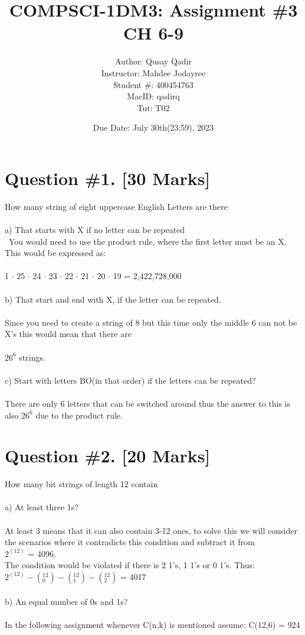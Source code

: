 \documentclass{article}
\title{
\LARGE COMPSCI-1DM3: Assignment \#3 CH 6-9 \\
}
\author{\Large Author: Qusay Qadir \\
\large Instructor: Mahdee Jodayree \\ Student \#: 400454763 \\MacID: qadirq  \\Tut: T02 \\ }
\date{Due Date: July 30th(23:59), 2023}
\begin{document}
\maketitle
\newpage
\tableofcontents
\newpage

\section{Question \#1. [30 Marks]}
How many string of eight uppercase English Letters are there \\\\
a) That starts with X if no letter can be repeated \\\
You would need to use the product rule, where the first letter must be an X. This would be expressed as: \\\\
1 $\cdot$ 25 $\cdot$ 24 $\cdot$ 23 $\cdot$ 22 $\cdot$ 21 $\cdot$ 20 $\cdot$ 19 = 2,422,728,000 \\\\
b) That start and end with X, if the letter can be repeated.  \\\\
Since you need to create a string of 8 but this time only the middle 6 can not be X's this would mean that there are \\\\
$26^6$ strings. \\\\
c) Start with letters BO(in that order) if the letters can be repeated? \\\\
There are only 6 letters that can be switched around thus the answer to this is also $26^6$ due to the product rule.
\newpage
\section{Question \#2. [20 Marks]}
How many bit strings of length 12 contain \\ \\
a) At least three 1s? \\\\
At least 3 means that it can also contain 3-12 ones, to solve this we will consider the scenarios where it contradicts this condition and subtract it from \\ $2^{(12)}$  = 4096.
 \\The condition would be violated if there is 2 1's, 1 1's or 0 1's. 
 Thus: \\$2^{(12)} -  (_{0}^{12}) -  (_{1}^{12}) -  (_{2}^{12})$ = 4017 \\\\
 b) An equal number of 0s and 1s? \\\\
 In the following assignment whenever C(n,k) is mentioned assume: 
 \equation{}
 \equation{}
 C(12,6) = 924
\end{document}

